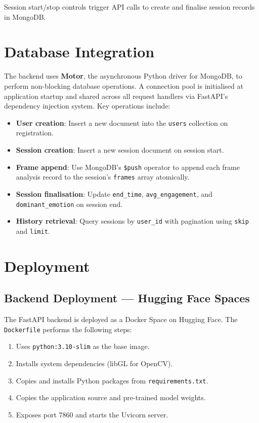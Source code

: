 Session start/stop controls trigger API calls to create and finalise session
records in MongoDB.

\section{Database Integration}

The backend uses \textbf{Motor}, the asynchronous Python driver for MongoDB,
to perform non-blocking database operations. A connection pool is initialised
at application startup and shared across all request handlers via FastAPI's
dependency injection system. Key operations include:

\begin{itemize}
    \item \textbf{User creation}: Insert a new document into the
          \texttt{users} collection on registration.
    \item \textbf{Session creation}: Insert a new session document on
          session start.
    \item \textbf{Frame append}: Use MongoDB's \texttt{\$push} operator to
          append each frame analysis record to the session's \texttt{frames}
          array atomically.
    \item \textbf{Session finalisation}: Update \texttt{end\_time},
          \texttt{avg\_engagement}, and \texttt{dominant\_emotion} on
          session end.
    \item \textbf{History retrieval}: Query sessions by \texttt{user\_id}
          with pagination using \texttt{skip} and \texttt{limit}.
\end{itemize}

\section{Deployment}

\subsection{Backend Deployment — Hugging Face Spaces}

The FastAPI backend is deployed as a Docker Space on Hugging Face. The
\texttt{Dockerfile} performs the following steps:

\begin{enumerate}
    \item Uses \texttt{python:3.10-slim} as the base image.
    \item Installs system dependencies (libGL for OpenCV).
    \item Copies and installs Python packages from \texttt{requirements.txt}.
    \item Copies the application source and pre-trained model weights.
    \item Exposes port 7860 and starts the Uvicorn server.
\end{enumerate}

